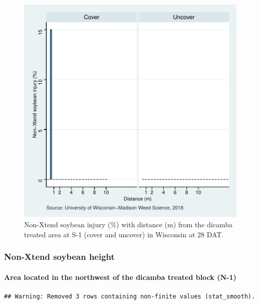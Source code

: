 \documentclass[]{article}
\let\oldparagraph\paragraph
\renewcommand{\paragraph}[1]{\oldparagraph{#1}\mbox{}}
\begin{document}
\begin{figure}
\centering
\includegraphics{Report_Dicamba_study_files/figure-latex/unnamed-chunk-103-1.pdf}
\caption{Non-Xtend soybean injury (\%) with distance (m) from the
dicamba treated area at S-1 (cover and uncover) in Wisconsin at 28 DAT.}
\end{figure}

\pagebreak
\newpage

\subsubsection{Non-Xtend soybean height}\label{non-xtend-soybean-height}

\paragraph{Area located in the northwest of the dicamba treated block
(N-1)}\label{area-located-in-the-northwest-of-the-dicamba-treated-block-n-1-1}

\begin{verbatim}
## Warning: Removed 3 rows containing non-finite values (stat_smooth).
\end{verbatim}
\end{document}
